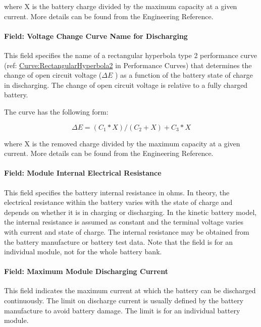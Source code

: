 where X is the battery charge divided by the maximum capacity at a given current. More details can be found from the Engineering Reference.

\paragraph{Field: Voltage Change Curve Name for Discharging}\label{field-voltage-change-curve-name-for-discharging}

This field specifies the name of a rectangular hyperbola type 2 performance curve (ref: \hyperref[curverectangularhyperbola2]{Curve:RectangularHyperbola2} in Performance Curves) that determines the change of open circuit voltage (\(\Delta E\) ) as a function of the battery state of charge in discharging. The change of open circuit voltage is relative to a fully charged battery.

The curve has the following form:

\begin{equation}
\Delta E = ({C_1}*X)/({C_2} + X) + {C_3}*X
\end{equation}

where X is the removed charge divided by the maximum capacity at a given current. More details can be found from the Engineering Reference.

\paragraph{Field: Module Internal Electrical Resistance}\label{field-module-internal-electrical-resistance}

This field specifies the battery internal resistance in ohms. In theory, the electrical resistance within the battery varies with the state of charge and depends on whether it is in charging or discharging. In the kinetic battery model, the internal resistance is assumed as constant and the terminal voltage varies with current and state of charge. The internal resistance may be obtained from the battery manufacture or battery test data. Note that the field is for an individual module, not for the whole battery bank.

\paragraph{Field: Maximum Module Discharging Current}\label{field-maximum-module-discharging-current}

This field indicates the maximum current at which the battery can be discharged continuously. The limit on discharge current is usually defined by the battery manufacture to avoid battery damage. The limit is for an individual battery module.

